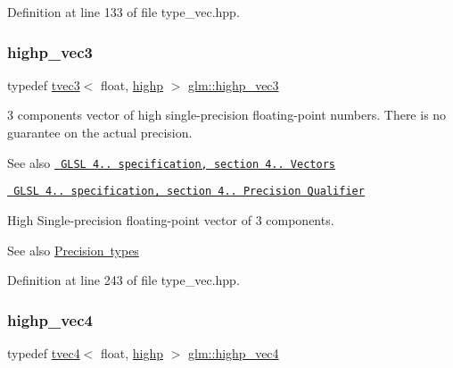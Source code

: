 Definition at line 133 of file type\+\_\+vec.\+hpp.

\mbox{\label{group__core__precision_ga1ef07d2502ea09b1e63998813a3d4330}} 
\subsubsection{\texorpdfstring{highp\_vec3}{highp\_vec3}}
{\footnotesize\ttfamily typedef \mbox{\hyperlink{structglm_1_1tvec3}{tvec3}}$<$ float, \mbox{\hyperlink{namespaceglm_a0f04f086094c747d227af4425893f545ac6f7eab42eacbb10d59a58e95e362074}{highp}} $>$ \mbox{\hyperlink{group__core__precision_ga1ef07d2502ea09b1e63998813a3d4330}{glm\+::highp\+\_\+vec3}}}

3 components vector of high single-\/precision floating-\/point numbers. There is no guarantee on the actual precision.

\begin{DoxySeeAlso}{See also}
\href{http://www.opengl.org/registry/doc/GLSLangSpec.4.20.8.pdf}{\texttt{ G\+L\+SL 4.. specification, section 4.. Vectors}} 

\href{http://www.opengl.org/registry/doc/GLSLangSpec.4.20.8.pdf}{\texttt{ G\+L\+SL 4.. specification, section 4.. Precision Qualifier}}
\end{DoxySeeAlso}
High Single-\/precision floating-\/point vector of 3 components. \begin{DoxySeeAlso}{See also}
\mbox{\hyperlink{group__core__precision}{Precision types}} 
\end{DoxySeeAlso}


Definition at line 243 of file type\+\_\+vec.\+hpp.

\mbox{\label{group__core__precision_ga5f573b0132805b54cb9205eea1c86483}} 
\subsubsection{\texorpdfstring{highp\_vec4}{highp\_vec4}}
{\footnotesize\ttfamily typedef \mbox{\hyperlink{structglm_1_1tvec4}{tvec4}}$<$ float, \mbox{\hyperlink{namespaceglm_a0f04f086094c747d227af4425893f545ac6f7eab42eacbb10d59a58e95e362074}{highp}} $>$ \mbox{\hyperlink{group__core__precision_ga5f573b0132805b54cb9205eea1c86483}{glm\+::highp\+\_\+vec4}}}

